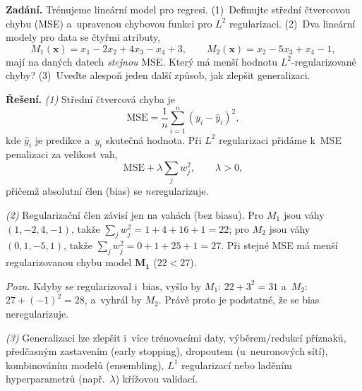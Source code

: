 \begin{priklad}
\par
\textbf{Zadání.} Trénujeme lineární model pro regresi. (1)~Definujte střední čtvercovou chybu (MSE) a~upravenou chybovou funkci pro $L^2$ regularizaci. (2)~Dva lineární modely pro data se čtyřmi atributy,
\[
  M_1(\mathbf{x}) = x_1 - 2x_2 + 4x_3 - x_4 + 3, \qquad
  M_2(\mathbf{x}) = x_2 - 5x_3 + x_4 - 1,
\]
mají na daných datech \emph{stejnou} MSE. Který má menší hodnotu $L^2$-regularizované chyby? (3)~Uveďte alespoň jeden další způsob, jak zlepšit generalizaci.

\smallskip
\textbf{Řešení.} \emph{(1)} Střední čtvercová chyba je
\[
  \mathrm{MSE} = \frac{1}{n}\sum_{i=1}^{n} (y_i - \hat y_i)^2,
\]
kde $\hat y_i$ je predikce a~$y_i$ skutečná hodnota. Při $L^2$ regularizaci přidáme k~MSE penalizaci za velikost vah,
\[
  \mathrm{MSE} + \lambda \sum_{j} w_j^2,\qquad \lambda>0,
\]
přičemž absolutní člen (bias) se \emph{ne}regularizuje.

\emph{(2)} Regularizační člen závisí jen na vahách (bez biasu). Pro $M_1$ jsou váhy $(1,-2,4,-1)$, takže $\sum_j w_j^2 = 1+4+16+1 = \boxed{22}$; pro $M_2$ jsou váhy $(0,1,-5,1)$, takže $\sum_j w_j^2 = 0+1+25+1 = \boxed{27}$. Při stejné MSE má menší regularizovanou chybu model $\boldsymbol{M_1}$ ($22<27$).

\smallskip
\emph{Pozn.} Kdyby se regularizoval i~bias, vyšlo by $M_1$: $22+3^2=31$ a~$M_2$: $27+(-1)^2=28$, a~vyhrál by $M_2$. Právě proto je podstatné, že se bias neregularizuje.

\emph{(3)} Generalizaci lze zlepšit i~více trénovacími daty, výběrem/redukcí příznaků, předčasným zastavením (early stopping), dropoutem (u~neuronových sítí), kombinováním modelů (ensembling), $L^1$ regularizací nebo laděním hyperparametrů (např.\ $\lambda$) křížovou validací.
\end{priklad}
